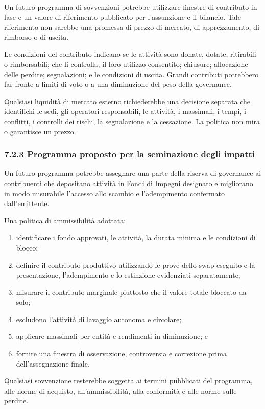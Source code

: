 \documentclass[11pt]{article}
\begin{document}
Un futuro programma di sovvenzioni potrebbe utilizzare finestre di contributo in fase e un valore di riferimento pubblicato per l'assunzione e il bilancio. Tale riferimento non sarebbe una promessa di prezzo di mercato, di apprezzamento, di rimborso o di uscita.

Le condizioni del contributo indicano se le attività sono donate, dotate, ritirabili o rimborsabili; che li controlla; il loro utilizzo consentito; chiusure; allocazione delle perdite; segnalazioni; e le condizioni di uscita. Grandi contributi potrebbero far fronte a limiti di voto o a una diminuzione del peso della governance.

Qualsiasi liquidità di mercato esterno richiederebbe una decisione separata che identifichi le sedi, gli operatori responsabili, le attività, i massimali, i tempi, i conflitti, i controlli dei rischi, la segnalazione e la cessazione. La politica non mira o garantisce un prezzo.

\subsubsection*{7.2.3 Programma proposto per la seminazione degli impatti}

Un futuro programma potrebbe assegnare una parte della riserva di governance ai contribuenti che depositano attività in Fondi di Impegni designato e migliorano in modo misurabile l'accesso allo scambio e l'adempimento confermato dall'emittente.

Una politica di ammissibilità adottata:

\begin{enumerate}[leftmargin=*]
\item identificare i fondo approvati, le attività, la durata minima e le condizioni di blocco;
\item definire il contributo produttivo utilizzando le prove dello swap eseguito e la presentazione, l'adempimento e lo estinzione evidenziati separatamente;
\item misurare il contributo marginale piuttosto che il valore totale bloccato da solo;
\item escludono l'attività di lavaggio autonoma e circolare;
\item applicare massimali per entità e rendimenti in diminuzione; e
\item fornire una finestra di osservazione, controversia e correzione prima dell'assegnazione finale.
\end{enumerate}
Qualsiasi sovvenzione resterebbe soggetta ai termini pubblicati del programma, alle norme di acquisto, all'ammissibilità, alla conformità e alle norme sulle perdite.
\end{document}
